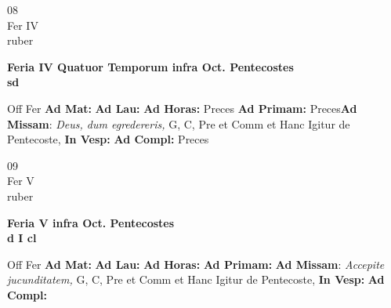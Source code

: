 \documentclass[10pt, openany]{book}
\begin{document}
    \begin{center}
        \begin{minipage}{3.5in}
            \vspace{2em}
            \begin{minipage}{0.5in}
                {\Huge 08} \\
                {\normalsize Fer IV} \\
                {\normalsize ruber}
            \end{minipage}
            \begin{minipage}{3.0in}
                \textbf{ \large Feria IV Quatuor Temporum infra Oct. Pentecostes \\
                \textnormal{\normalsize sd}} \\ 
            \end{minipage}
            \begin{justify}Off Fer
                \textbf{Ad Mat: }
                \textbf{Ad Lau: }
                \textbf{Ad Horas: }Preces
                \textbf{Ad Primam: }Preces\textbf{Ad Missam}: \textit{Deus, dum egredereris,} G, C, Pre et Comm et Hanc Igitur de Pentecoste,  
                \textbf{In Vesp: }
                \textbf{Ad Compl: }Preces
            \end{justify}
        \end{minipage}
    \end{center}

    \begin{center}
        \begin{minipage}{3.5in}
            \vspace{2em}
            \begin{minipage}{0.5in}
                {\Huge 09} \\
                {\normalsize Fer V} \\
                {\normalsize ruber}
            \end{minipage}
            \begin{minipage}{3.0in}
                \textbf{ \large Feria V infra Oct. Pentecostes \\
                \textnormal{\normalsize d I cl}} \\ 
            \end{minipage}
            \begin{justify}Off Fer
                \textbf{Ad Mat: }
                \textbf{Ad Lau: }
                \textbf{Ad Horas: }
                \textbf{Ad Primam: }\textbf{Ad Missam}: \textit{Accepite jucunditatem,} G, C, Pre et Comm et Hanc Igitur de Pentecoste,  
                \textbf{In Vesp: }
                \textbf{Ad Compl: }
            \end{justify}
        \end{minipage}
    \end{center}
\end{document}

